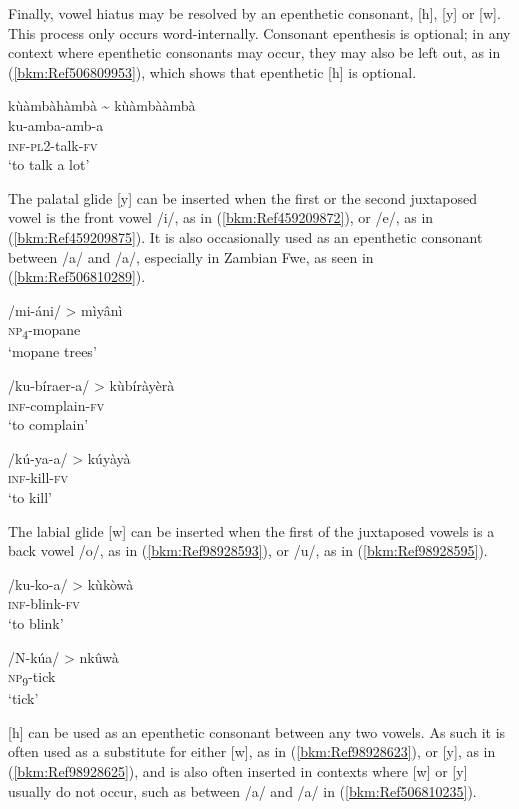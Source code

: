 Finally, vowel hiatus may be resolved by an epenthetic consonant, [h], [y] or [w]. This process only occurs word-internally. Consonant epenthesis is optional; in any context where epenthetic consonants may occur, they may also be left out, as in (\ref{bkm:Ref506809953}), which shows that epenthetic [h] is optional.

\ea
\label{bkm:Ref506809953}
kùàmbàhàmbà {\textasciitilde} kùàmbààmbà\\
ku-amba-amb-a\\
\textsc{inf}-\textsc{pl}2-talk-\textsc{fv}\\
\glt ‘to talk a lot’
\z

The palatal glide [y] can be inserted when the first or the second juxtaposed vowel is the front vowel /i/, as in (\ref{bkm:Ref459209872}), or /e/, as in (\ref{bkm:Ref459209875}). It is also occasionally used as an epenthetic consonant between /a/ and /a/, espe\-cially in Zambian Fwe, as seen in (\ref{bkm:Ref506810289}).

\ea
\label{bkm:Ref459209872}
/mi-áni/ > mìyânì\\
\textsc{np}\textsubscript{4}-mopane\\
\glt ‘mopane trees’
\z

\ea
\label{bkm:Ref459209875}
/ku-bíraer-a/ > kùbíràyèrà\\
\textsc{inf}-complain-\textsc{fv}\\
\glt ‘to complain’
\z

\ea
\label{bkm:Ref506810289}
/kú-ya-a/ > kúyàyà\\
\textsc{inf}-kill-\textsc{fv}\\
\glt ‘to kill’
\z

The labial glide [w] can be inserted when the first of the juxtaposed vowels is a back vowel /o/, as in (\ref{bkm:Ref98928593}), or /u/, as in (\ref{bkm:Ref98928595}).

\ea
\label{bkm:Ref98928593}
/ku-ko-a/ > kùkòwà\\
\textsc{inf}-blink-\textsc{fv}\\
\glt ‘to blink’
\z

\ea
\label{bkm:Ref98928595}
/N-kúa/ > nkûwà\\
\textsc{np}\textsubscript{9}-tick\\
\glt ‘tick’
\z

[h] can be used as an epenthetic consonant between any two vowels. As such it is often used as a substitute for either [w], as in (\ref{bkm:Ref98928623}), or [y], as in (\ref{bkm:Ref98928625}), and is also often inserted in contexts where [w] or [y] usually do not occur, such as between /a/ and /a/ in (\ref{bkm:Ref506810235}).

